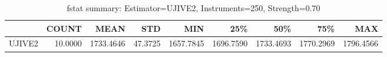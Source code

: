 \begin{table}[ht]
\centering
\caption{fstat summary: Estimator=UJIVE2, Instruments=250, Strength=0.70}
\begin{tabular}{lrrrrrrrr}
\toprule
 & COUNT & MEAN & STD & MIN & 25\% & 50\% & 75\% & MAX \\
\midrule
UJIVE2 & 10.0000 & 1733.4646 & 47.3725 & 1657.7845 & 1696.7590 & 1733.4693 & 1770.2969 & 1796.4566 \\
\bottomrule
\end{tabular}
\end{table}
